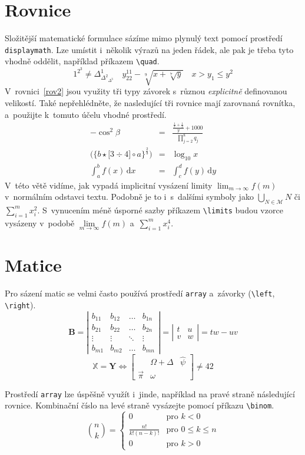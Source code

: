 \documentclass[a4paper, twocolumn, 11pt]{article}
\begin{document}
\section{Rovnice}
Složitější matematické formulace sázíme mimo plynulý text pomocí prostředí \verb|displaymath|. Lze umístit i~několik výrazů na jeden řádek, ale pak je třeba tyto vhodně oddělit, například příkazem \verb|\quad|. 
$$
1^{{2}^{3}} \neq \Delta^{1}_{{\Delta^{2}}_{\Delta^{3}}}
\quad
y^{11}_{22} - \sqrt[9]{x+{\sqrt[7]{y}}}
\quad
x > y_1 \leq y^{2}
$$
V~rovnici~\eqref{rov2} jsou využity tři typy závorek s~různou \emph{explicitně} definovanou velikostí. Také nepřehlédněte, že nasledující tři rovnice mají zarovnaná rovnítka, a~použijte k~tomuto účelu vhodné prostředí. 
\begin{eqnarray}
- \cos^{2}\beta &=& \frac{\frac{\frac{1}{x}+\frac{1}{3}}{y}+1000}{\prod\limits _{j=2}^8 q_j}\\
\bigg (\Big \{ b \star \big[ 3 \div 4 \big] \circ a \Big\}^{\frac{2}{3}} \bigg) &=& \log_{10} x \label{rov2}\\
\int_a^b f(x)\,\mathrm{d}x &=& \int_c^d f(y)\,\mathrm{d}y \label{rov3}
\end{eqnarray}
V~této větě vidíme, jak vypadá implicitní vysázení limity $\lim _{m \rightarrow \infty} f(m)$ v~normálním odstavci textu. Podobně je to i~s~dalšími symboly jako $\bigcup_{N \in \mathcal{M}} N$ či $\sum_{i=1}^{m} x_{i}^{2}$. S~vynucením méně úsporné sazby příkazem \verb|\limits| budou vzorce vysázeny v~podobě $\lim\limits_{m \rightarrow \infty} f(m)$ a~$\sum\limits^m_{i=1} x^4_i$.

\section{Matice}
Pro sázení matic se velmi často používá prostředí \verb|array| a~závorky (\verb|\left|, \verb|\right|). 
$$
\mathbf{B}=\left|\begin{array}{cccc}
b_{11} & b_{12} & \ldots & b_{1 n} \\
b_{21} & b_{22} & \ldots & b_{2 n} \\
\vdots & \vdots & \ddots & \vdots \\
b_{m 1} & b_{m 2} & \ldots & b_{m n}
\end{array}\right|=\left|\begin{array}{cc}
t & u \\
v & w
\end{array}\right|=t w-u v
$$
$$
\mathbb{X} = \mathbf{Y} \Longleftrightarrow 
\left[
\begin{array}{ccc}
& \Omega + \Delta & \hat{\psi} \\
\vec{\pi}& \omega &
\end{array}
\right] \neq 42
$$

Prostředí \verb|array| lze úspěšně využít i~jinde, například na pravé straně následující rovnice. Kombinační číslo na levé straně vysázejte pomocí příkazu \verb|\binom|.
$$
\binom{n}{k}=\left\{\begin{array}{cl}
0 & \text {pro } k<0\\
\frac{n !}{k !(n-k) !} & \text {pro } 0 \leq k \leq n \\
0 & \text {pro } k>0
\end{array}\right.
$$
\end{document}
